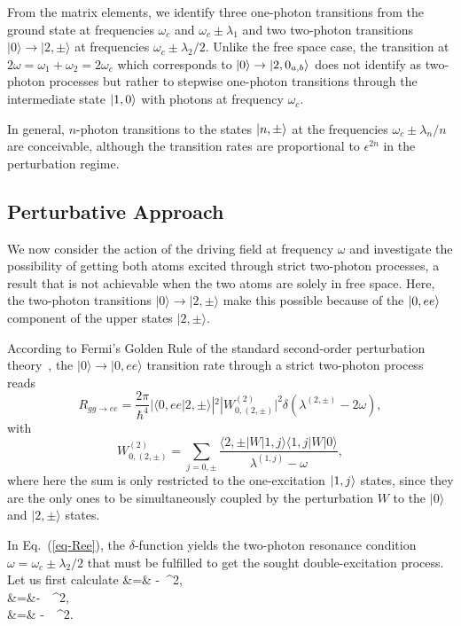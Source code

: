 From the matrix elements, we identify three one-photon transitions from the ground state at frequencies $\omega_c$ and $\omega_c \pm \lambda_1$ and two two-photon transitions $|0\rangle \rightarrow |2,\pm\rangle$ at frequencies $\omega_c \pm \lambda_2/2$.  Unlike the free space case, the transition at $2\omega=\omega_1+\omega_2=2\omega_c$ which corresponds to $| 0 \rangle \rightarrow | 2,0_{a,b} \rangle$ does not identify as two-photon processes but rather to stepwise one-photon transitions through the intermediate state $| 1,0 \rangle$ with photons at frequency $\omega_c$. 

In general, $n$-photon transitions to the states $| n,\pm \rangle$ at the frequencies $\omega_c \pm \lambda_n/n$ are conceivable, although the transition rates are proportional to $\epsilon^{2n}$ in the perturbation regime. 

\subsection{Perturbative Approach} 

We now consider the action of the driving field at frequency $\omega$ and investigate the possibility of getting both atoms excited through strict two-photon processes, a result that is not achievable when the two atoms are solely in free space. Here, the two-photon transitions $|0\rangle \rightarrow |2,\pm\rangle$ make this possible because of the $| 0,ee \rangle$ component of the upper states $|2,\pm\rangle$.

According to Fermi's Golden Rule of the standard second-order perturbation theory~\cite{Lou00}, the $|0\rangle \rightarrow |0,ee\rangle$ transition rate through a strict two-photon process reads
\[ R_{gg \rightarrow ee} = \frac{2 \pi}{\hbar^4} |\langle 0,ee | 2,\pm \rangle|^2 |W^{(2)}_{0,(2,\pm)}|^2 \delta(\lambda^{(2,\pm)} - 2\omega), \label{eq-Ree}\]
with
\[  W^{(2)}_{0,(2,\pm)} = \sum_{j=0,\pm} \frac{\langle 2,\pm | W |1, j\rangle \langle 1,j | W |0\rangle}{\lambda^{(1,j)}-\omega},\]
where here the sum is only restricted to the one-excitation $| 1,j \rangle$ states, since they are the only ones to be simultaneously coupled by the perturbation $W$  to the $|0\rangle$ and $|2,\pm\rangle$ states. 

In Eq.~(\ref{eq-Ree}), the $\delta$-function yields the two-photon resonance condition $\omega = \omega_c \pm \lambda_2/2$ that must be fulfilled to get the sought double-excitation process.  Let us first calculate
\bea
{} &=&  -  \,\epsilon^2, \\
 &=&- \, \,\epsilon^2,\\
 &=& - \, \,\epsilon^2.
\eea

